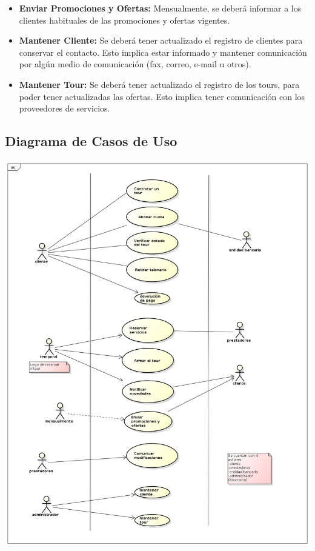 \documentclass[12pt,a4paper]{article}
\begin{document}
\begin{itemize}
			\item \textbf{Enviar Promociones y Ofertas:} Mensualmente, se deberá informar a los clientes habituales de las promociones y ofertas vigentes.

			\item \textbf{Mantener Cliente:} Se deberá tener actualizado el registro de clientes para conservar el contacto. Esto implica estar informado y mantener comunicación por algún medio de comunicación (fax, correo, e-mail u otros). 

			\item \textbf{Mantener Tour:} Se deberá tener actualizado el registro de los tours, para poder tener actualizadas las ofertas. Esto implica tener comunicación con los proveedores de servicios.
		\end{itemize}

\subsection{Diagrama de Casos de Uso}
	\includegraphics[scale=0.5]{images/UseCaseDiagram0.png}
\end{document}
